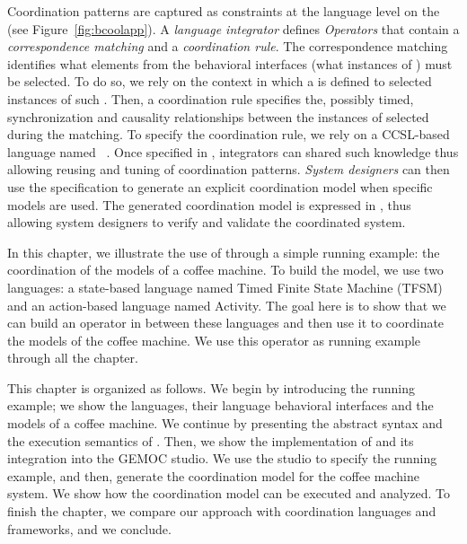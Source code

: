 Coordination patterns are captured as constraints at the language level on the \dse (see Figure~\ref{fig:bcoolapp}). A \emph{language integrator} defines \emph{Operators} that contain a \emph{correspondence matching} and a \emph{coordination rule}. The correspondence matching identifies what elements from the behavioral interfaces (\ie what instances of \dse) must be selected. To do so, we rely on the context in which a \dse is defined to selected instances of such \dse. Then, a coordination rule specifies the, possibly timed, synchronization and causality relationships between the instances of \dse selected during the matching. To specify the coordination rule, we rely on a CCSL-based language named \moccml~\cite{moccmlbib}. Once specified in \bcool, integrators can shared such knowledge thus allowing reusing and tuning of coordination patterns. \emph{System designers} can then use the \bcool specification to generate an explicit coordination model when specific models are used. The generated coordination model is expressed in \ccsl, thus allowing system designers to verify and validate the coordinated system.  

	



In this chapter, we illustrate the use of \bcool through a simple running example: the coordination of the models of a coffee machine. To build the model, we use two languages: a state-based language named Timed Finite State Machine (TFSM) and an action-based language named Activity. The goal here is to show that we can build an operator in \bcool between these languages and then use it to coordinate the models of the coffee machine. We use this operator as running example through all the chapter. 
	
This chapter is organized as follows. We begin by introducing the running example; we show the languages, their language behavioral interfaces and the models of a coffee machine. We continue by presenting the abstract syntax and the execution semantics of \bcool. Then, we show the implementation of \bcool and its integration into the GEMOC studio. We use the studio to specify the running example, and then, generate the coordination model for the coffee machine system. We show how the coordination model can be executed and analyzed. To finish the chapter, we compare our approach with coordination languages and frameworks, and we conclude.


